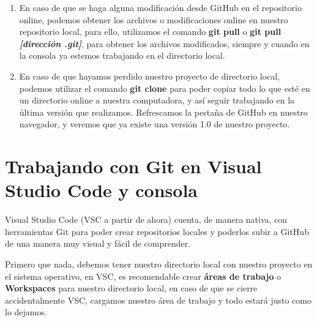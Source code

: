\begin{enumerate}
    \item En caso de que se haga alguna modificación desde GitHub en el repositorio online, podemos obtener los archivos o modificaciones online en nuestro repositorio local, para ello, utilizamos el comando \textbf{git pull} o \textbf{git pull \textit{[dirección .git]}}, para obtener los archivos modificados, siempre y cuando en la consola ya estemos trabajando en el directorio local.
    \item En caso de que hayamos perdido nuestro proyecto de directorio local, podemos utilizar el comando \textbf{git clone} para poder copiar todo lo que esté en un directorio online a nuestra computadora, y así seguir trabajando en la última versión que realizamos. Refrescamos la pestaña de GitHub en nuestro navegador, y veremos que ya existe una versión 1.0 de nuestro proyecto.
\end{enumerate}



\section{Trabajando con Git en Visual Studio Code y consola}
\hspace{0.55cm}Visual Studio Code (VSC a partir de ahora) cuenta, de manera nativa, con herramientas Git para poder crear repositorios locales y poderlos subir a GitHub de una manera muy visual y fácil de comprender.

Primero que nada, debemos tener nuestro directorio local con nuestro proyecto en el sistema operativo, en VSC, es recomendable crear \textbf{áreas de trabajo} o \textbf{Workspaces} para nuestro directorio local, en caso de que se cierre accidentalmente VSC, cargamos nuestro área de trabajo y todo estará justo como lo dejamos.

